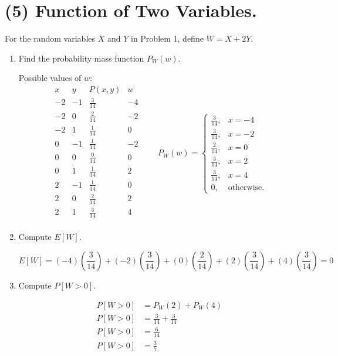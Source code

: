 \documentclass[12pt]{article}
\newenvironment{bluetext}
    {\par\begingroup\color{blue}\parindent=0pt\ignorespaces}
    {\par\endgroup\noindent\ignorespacesafterend}
\begin{document}
\section*{(5) Function of Two Variables.}

For the random variables $X$ and $Y$ in Problem 1, define $W = X + 2Y$.

\begin{enumerate}
    \item[(a)] Find the probability mass function $P_W(w)$.
    \begin{bluetext}
        Possible values of $w$:
        \[
\begin{array}{c|c|c|c}
x & y & P(x,y) & w \\ \hline
-2 & -1 & \frac{3}{14} & -4 \\[4pt]
-2 & 0 & \frac{2}{14} & -2 \\[4pt]
-2 & 1 & \frac{1}{14} & 0 \\[4pt]
0  & -1 & \frac{1}{14} & -2 \\[4pt]
0  & 0 & \frac{0}{14} & 0 \\[4pt]
0  & 1 & \frac{1}{14} & 2 \\[4pt]
2  & -1 & \frac{1}{14} & 0 \\[4pt]
2  & 0 & \frac{2}{14} & 2 \\[4pt]
2  & 1 & \frac{3}{14} & 4 \\
\end{array}
\qquad P_W(w)= \begin{cases}
        \frac{3}{14}, & x=-4\\
        \frac{3}{14}, & x=-2\\
        \frac{2}{14}, & x=0  \\
        \frac{3}{14}, & x=2  \\
        \frac{3}{14}, & x=4  \\
        0, & \text{otherwise.}
        \end{cases}\]
    \end{bluetext}
    \item[(b)] Compute $E[W]$.\
    \begin{bluetext}
        \[
            E[W]=(-4)\left(\frac{3}{14}\right)+(-2)\left(\frac{3}{14}\right)+(0)\left(\frac{2}{14}\right)+(2)\left(\frac{3}{14}\right)+(4)\left(\frac{3}{14}\right)=0
        \]
    \end{bluetext}
    \item[(c)] Compute $P[W > 0]$.
    \begin{bluetext}
        \[
        \begin{aligned}
            P[W>0]&=P_W(2)+P_W(4)\\
            P[W>0]&=\frac{3}{14}+\frac{3}{14}\\
            P[W>0]&=\frac{6}{14}\\
            P[W>0]&=\frac{3}{7}\\
        \end{aligned}
        \]
    \end{bluetext}
\end{enumerate}
\newpage
\end{document}
